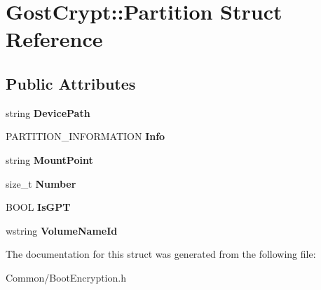 \hypertarget{struct_gost_crypt_1_1_partition}{}\section{Gost\+Crypt\+:\+:Partition Struct Reference}
\label{struct_gost_crypt_1_1_partition}
\subsection*{Public Attributes}
\begin{DoxyCompactItemize}
\item 
\mbox{\label{struct_gost_crypt_1_1_partition_a7488a97596d04b19e594d7b5045fef60}} 
string {\bfseries Device\+Path}
\item 
\mbox{\label{struct_gost_crypt_1_1_partition_a58b1164a9323051fb5b466fdc5bf1020}} 
P\+A\+R\+T\+I\+T\+I\+O\+N\+\_\+\+I\+N\+F\+O\+R\+M\+A\+T\+I\+ON {\bfseries Info}
\item 
\mbox{\label{struct_gost_crypt_1_1_partition_ad03f7390c7d06380782125bc4db101b1}} 
string {\bfseries Mount\+Point}
\item 
\mbox{\label{struct_gost_crypt_1_1_partition_a3ac6f3dfd0154b8692d99f09e450e98a}} 
size\+\_\+t {\bfseries Number}
\item 
\mbox{\label{struct_gost_crypt_1_1_partition_a6d4b9fb5042a2d5163bf3e8b509d5d21}} 
B\+O\+OL {\bfseries Is\+G\+PT}
\item 
\mbox{\label{struct_gost_crypt_1_1_partition_a956608296c021462332b0e0924b03dde}} 
wstring {\bfseries Volume\+Name\+Id}
\end{DoxyCompactItemize}


The documentation for this struct was generated from the following file\+:\begin{DoxyCompactItemize}
\item 
Common/Boot\+Encryption.\+h\end{DoxyCompactItemize}
